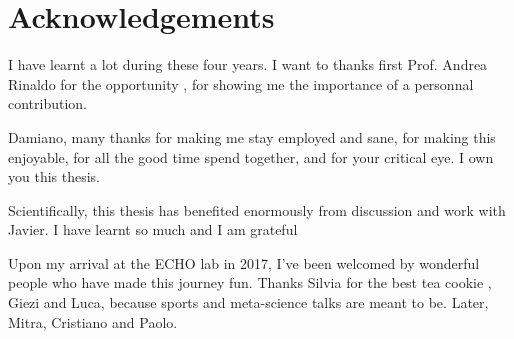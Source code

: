 




 \chapter{Acknowledgements}
 I have learnt a lot during these four years. I want to thanks first Prof. Andrea Rinaldo for the opportunity , for showing me the importance of a personnal contribution.  
 
 Damiano, many thanks for making me stay employed and sane, for making this enjoyable, for all the good time spend together, and for your critical eye. I own you this thesis.
 
 Scientifically, this thesis has benefited enormously from discussion and work with Javier. I have learnt so much and I am grateful
 
 Upon my arrival at the ECHO lab in 2017, I've been welcomed by wonderful people who have made this journey fun. Thanks Silvia for the best tea cookie , Giezi and Luca, because sports and meta-science talks are meant to be. Later, Mitra, Cristiano and Paolo.
 
